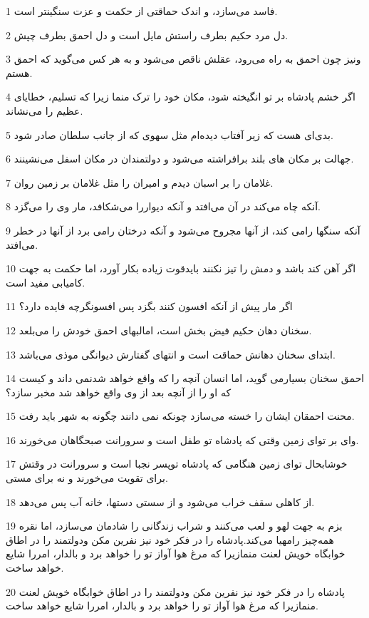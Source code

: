 \par 1 فاسد می‌سازد، و اندک حماقتی از حکمت و عزت سنگینتر است.
\par 2 دل مرد حکیم بطرف راستش مایل است و دل احمق بطرف چپش.
\par 3 ونیز چون احمق به راه می‌رود، عقلش ناقص می‌شود و به هر کس می‌گوید که احمق هستم.
\par 4 اگر خشم پادشاه بر تو انگیخته شود، مکان خود را ترک منما زیرا که تسلیم، خطایای عظیم را می‌نشاند.
\par 5 بدی‌ای هست که زیر آفتاب دیده‌ام مثل سهوی که از جانب سلطان صادر شود.
\par 6 جهالت بر مکان های بلند برافراشته می‌شود و دولتمندان در مکان اسفل می‌نشینند.
\par 7 غلامان را بر اسبان دیدم و امیران را مثل غلامان بر زمین روان.
\par 8 آنکه چاه می‌کند در آن می‌افتد و آنکه دیواررا می‌شکافد، مار وی را می‌گزد.
\par 9 آنکه سنگها رامی کند، از آنها مجروح می‌شود و آنکه درختان رامی برد از آنها در خطر می‌افتد.
\par 10 اگر آهن کند باشد و دمش را تیز نکنند بایدقوت زیاده بکار آورد، اما حکمت به جهت کامیابی مفید است.
\par 11 اگر مار پیش از آنکه افسون کنند بگزد پس افسونگر‌چه فایده دارد؟
\par 12 سخنان دهان حکیم فیض بخش است، امالبهای احمق خودش را می‌بلعد.
\par 13 ابتدای سخنان دهانش حماقت است و انتهای گفتارش دیوانگی موذی می‌باشد.
\par 14 احمق سخنان بسیارمی گوید، اما انسان آنچه را که واقع خواهد شدنمی داند و کیست که او را از آنچه بعد از وی واقع خواهد شد مخبر سازد؟
\par 15 محنت احمقان ایشان را خسته می‌سازد چونکه نمی دانند چگونه به شهر باید رفت.
\par 16 وای بر تو‌ای زمین وقتی که پادشاه تو طفل است و سرورانت صبحگاهان می‌خورند.
\par 17 خوشابحال تو‌ای زمین هنگامی که پادشاه توپسر نجبا است و سرورانت در وقتش برای تقویت می‌خورند و نه برای مستی.
\par 18 از کاهلی سقف خراب می‌شود و از سستی دستها، خانه آب پس می‌دهد.
\par 19 بزم به جهت لهو و لعب می‌کنند و شراب زندگانی را شادمان می‌سازد، اما نقره همه‌چیز رامهیا می‌کند.پادشاه را در فکر خود نیز نفرین مکن ودولتمند را در اطاق خوابگاه خویش لعنت منمازیرا که مرغ هوا آواز تو را خواهد برد و بالدار، امررا شایع خواهد ساخت.
\par 20 پادشاه را در فکر خود نیز نفرین مکن ودولتمند را در اطاق خوابگاه خویش لعنت منمازیرا که مرغ هوا آواز تو را خواهد برد و بالدار، امررا شایع خواهد ساخت.
 
